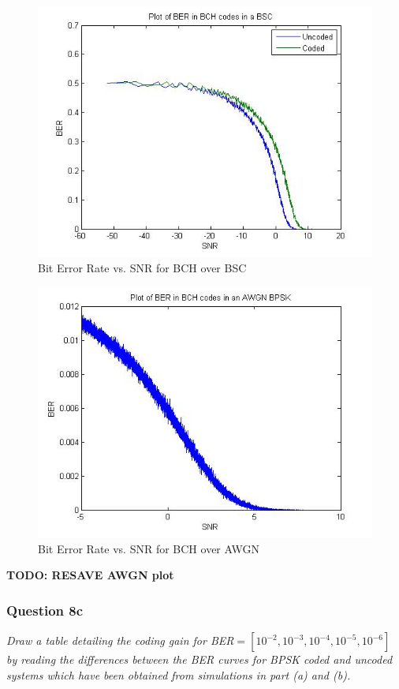 \documentclass[a4paper]{article}
\begin{document}
\begin{figure}[H]
\centering
\includegraphics[scale=0.5]{plotBER_BSC_SNR.jpg}
\caption{Bit Error Rate vs. SNR for BCH over BSC}
\end{figure}

\begin{figure}[H]
\centering
\includegraphics[scale=0.5]{plotBER_AWGN.jpg} 
\caption{Bit Error Rate vs. SNR for BCH over AWGN}
\end{figure}
\textbf{TODO: RESAVE AWGN plot} 

\subsubsection{Question 8c} \textit{Draw a table detailing the coding gain for BER$= [10^{-2}, 10^{-3}, 10^{-4} , 10^{-5} , 10^{-6} ]$ by reading the differences between the BER curves for BPSK coded and uncoded systems which have been obtained from simulations in part (a) and (b).} \\
\\
\end{document}

